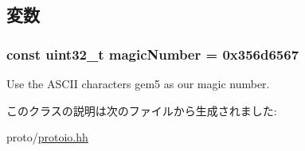 \subsection{変数}
\hypertarget{classProtoStream_aae89cf77af8ce1aad21e45dff2ea0e48}{
\subsubsection[{magicNumber}]{\setlength{\rightskip}{0pt plus 5cm}const {\bf uint32\_\-t} {\bf magicNumber} = 0x356d6567}}
\label{classProtoStream_aae89cf77af8ce1aad21e45dff2ea0e48}


Use the ASCII characters gem5 as our magic number. 

このクラスの説明は次のファイルから生成されました:\begin{DoxyCompactItemize}
\item 
proto/\hyperlink{protoio_8hh}{protoio.hh}\end{DoxyCompactItemize}
